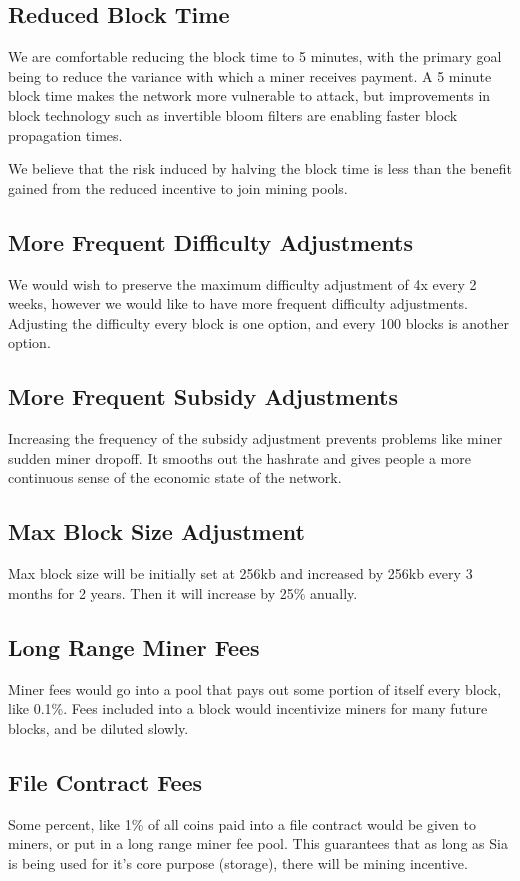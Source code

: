 \documentclass[twocolumn]{article}
\begin{document}
\subsection{Reduced Block Time}
We are comfortable reducing the block time to 5 minutes, with the primary goal being to reduce the variance with which a miner receives payment.
A 5 minute block time makes the network more vulnerable to attack, but improvements in block technology such as invertible bloom filters \cite{ibf} are enabling faster block propagation times.

We believe that the risk induced by halving the block time is less than the benefit gained from the reduced incentive to join mining pools.

\subsection{More Frequent Difficulty Adjustments}
We would wish to preserve the maximum difficulty adjustment of 4x every 2 weeks, however we would like to have more frequent difficulty adjustments.
Adjusting the difficulty every block is one option, and every 100 blocks is another option.

\subsection{More Frequent Subsidy Adjustments}
Increasing the frequency of the subsidy adjustment prevents problems like miner sudden miner dropoff.
It smooths out the hashrate and gives people a more continuous sense of the economic state of the network.

\subsection{Max Block Size Adjustment}
Max block size will be initially set at 256kb and increased by 256kb every 3 months for 2 years.
Then it will increase by 25\% anually.

\subsection{Long Range Miner Fees}
Miner fees would go into a pool that pays out some portion of itself every block, like 0.1\%.
Fees included into a block would incentivize miners for many future blocks, and be diluted slowly.

\subsection{File Contract Fees}
Some percent, like 1\% of all coins paid into a file contract would be given to miners, or put in a long range miner fee pool.
This guarantees that as long as Sia is being used for it's core purpose (storage), there will be mining incentive.
\end{document}
